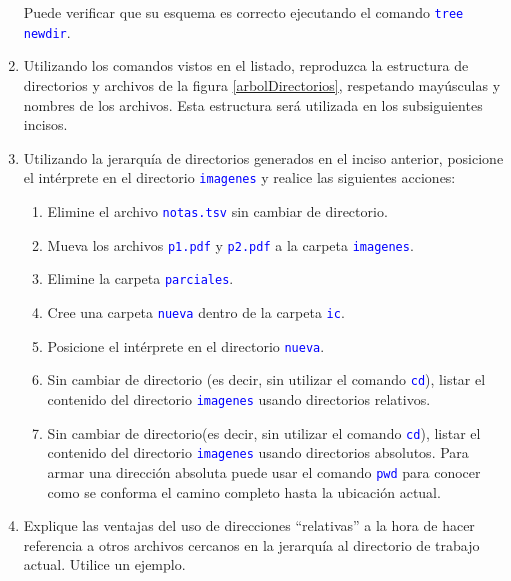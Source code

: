 \documentclass[12pt]{article}
\newcommand{\cw}[1]{\texttt{\textcolor{blue}{#1}}}
\begin{document}
\begin{enumerate}[resume]
        Puede verificar que su esquema es correcto ejecutando el comando
        \cw{tree newdir}.

    \item Utilizando los comandos vistos en el listado, reproduzca la
        estructura de directorios y archivos de la figura
        \ref{arbolDirectorios}, respetando mayúsculas y nombres de los
        archivos. Esta estructura será utilizada en los subsiguientes incisos.

    \item Utilizando la jerarquía de directorios generados en el inciso
        anterior, posicione el intérprete en el directorio \cw{imagenes} y
        realice las siguientes acciones:

    \begin{enumerate}

        \item Elimine el archivo \cw{notas.tsv} sin cambiar de directorio.

        \item Mueva los archivos \cw{p1.pdf} y \cw{p2.pdf} a la carpeta
            \cw{imagenes}.

        \item Elimine la carpeta \cw{parciales}.

        \item Cree una carpeta \cw{nueva} dentro de la carpeta \cw{ic}.

        \item Posicione el intérprete en el directorio \cw{nueva}.

        \item Sin cambiar de directorio (es decir, sin utilizar el comando
            \cw{cd}), listar el contenido del directorio \cw{imagenes} usando
            directorios relativos.

        \item Sin cambiar de directorio(es decir, sin utilizar el comando
            \cw{cd}), listar el contenido del directorio \cw{imagenes} usando
            directorios absolutos. Para armar una dirección absoluta puede
            usar el comando \cw{pwd} para conocer como se conforma el camino
            completo hasta la ubicación actual.

    \end{enumerate}

    \item Explique las ventajas del uso de direcciones ``relativas'' a la
            hora de hacer referencia a otros archivos cercanos en la jerarquía
            al directorio de trabajo actual. Utilice un ejemplo.


\end{enumerate}
\end{document}
